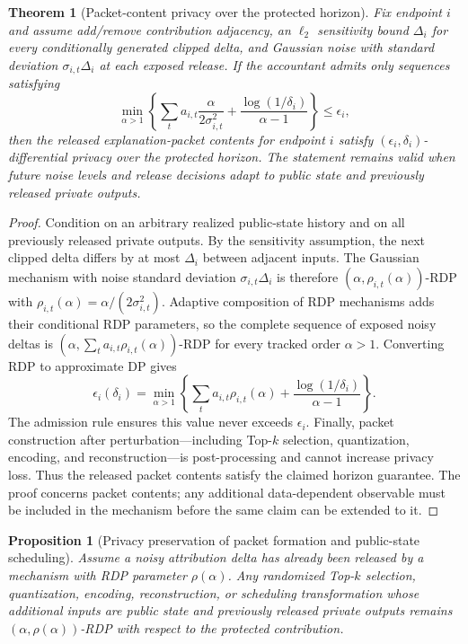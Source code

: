 \documentclass[10pt,conference]{IEEEtran}
\newtheorem{theorem}{Theorem}
\newtheorem{proposition}{Proposition}
\begin{document}
\begin{theorem}[Packet-content privacy over the protected horizon]
Fix endpoint $i$ and assume add/remove contribution adjacency, an $\ell_2$
sensitivity bound $\Delta_i$ for every conditionally generated clipped delta,
and Gaussian noise with standard deviation $\sigma_{i,t}\Delta_i$ at each
exposed release. If the accountant admits only sequences satisfying
\begin{equation}
\min_{\alpha>1}\left\{\sum_t a_{i,t}
\frac{\alpha}{2\sigma_{i,t}^{2}}+
\frac{\log(1/\delta_i)}{\alpha-1}\right\}\leq\epsilon_i,
\end{equation}
then the released explanation-packet contents for endpoint $i$ satisfy
$(\epsilon_i,\delta_i)$-differential privacy over the protected horizon.
The statement remains valid when future noise levels and release decisions
adapt to public state and previously released private outputs.
\end{theorem}

\begin{proof}
Condition on an arbitrary realized public-state history and on all previously
released private outputs. By the sensitivity assumption, the next clipped
delta differs by at most $\Delta_i$ between adjacent inputs. The Gaussian
mechanism with noise standard deviation $\sigma_{i,t}\Delta_i$ is therefore
$(\alpha,\rho_{i,t}(\alpha))$-RDP with
$\rho_{i,t}(\alpha)=\alpha/(2\sigma_{i,t}^{2})$. Adaptive composition of RDP
mechanisms adds their conditional RDP parameters, so the complete sequence of
exposed noisy deltas is
$(\alpha,\sum_ta_{i,t}\rho_{i,t}(\alpha))$-RDP for every tracked order
$\alpha>1$. Converting RDP to approximate DP gives
\begin{equation}
\epsilon_i(\delta_i)=\min_{\alpha>1}\left\{
\sum_ta_{i,t}\rho_{i,t}(\alpha)+
\frac{\log(1/\delta_i)}{\alpha-1}\right\}.
\end{equation}
The admission rule ensures this value never exceeds $\epsilon_i$. Finally,
packet construction after perturbation---including Top-$k$ selection,
quantization, encoding, and reconstruction---is post-processing and cannot
increase privacy loss. Thus the released packet contents satisfy the claimed
horizon guarantee. The proof concerns packet contents; any additional
data-dependent observable must be included in the mechanism before the same
claim can be extended to it.
\end{proof}

\begin{proposition}[Privacy preservation of packet formation and public-state
scheduling]
Assume a noisy attribution delta has already been released by a mechanism with
RDP parameter $\rho(\alpha)$. Any randomized Top-$k$ selection, quantization,
encoding, reconstruction, or scheduling transformation whose additional
inputs are public state and previously released private outputs remains
$(\alpha,\rho(\alpha))$-RDP with respect to the protected contribution.
\end{proposition}
\end{document}
